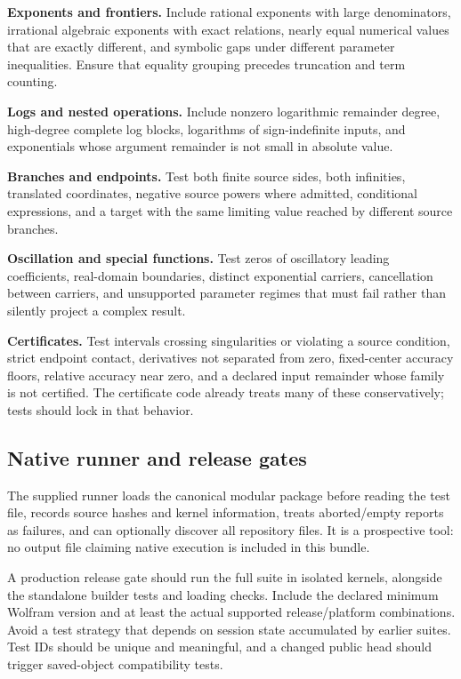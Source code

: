 \documentclass[11pt,a4paper]{article}
\newcommand{\code}[1]{\texttt{\detokenize{#1}}}
\theoremstyle{remark}\newtheorem{remark}[proposition]{Remark}
\begin{document}
\textbf{Exponents and frontiers.} Include rational exponents with large denominators, irrational algebraic exponents with exact relations, nearly equal numerical values that are exactly different, and symbolic gaps under different parameter inequalities. Ensure that equality grouping precedes truncation and term counting.

\textbf{Logs and nested operations.} Include nonzero logarithmic remainder degree, high-degree complete log blocks, logarithms of sign-indefinite inputs, and exponentials whose argument remainder is not small in absolute value.

\textbf{Branches and endpoints.} Test both finite source sides, both infinities, translated coordinates, negative source powers where admitted, conditional expressions, and a target with the same limiting value reached by different source branches.

\textbf{Oscillation and special functions.} Test zeros of oscillatory leading coefficients, real-domain boundaries, distinct exponential carriers, cancellation between carriers, and unsupported parameter regimes that must fail rather than silently project a complex result.

\textbf{Certificates.} Test intervals crossing singularities or violating a source condition, strict endpoint contact, derivatives not separated from zero, fixed-center accuracy floors, relative accuracy near zero, and a declared input remainder whose family is not certified. The certificate code already treats many of these conservatively; tests should lock in that behavior.\cite{certificates}

\subsection{Native runner and release gates}
The supplied runner loads the canonical modular package before reading the test file, records source hashes and kernel information, treats aborted/empty reports as failures, and can optionally discover all repository \code{.wlt} files. It is a prospective tool: no output file claiming native execution is included in this bundle.

A production release gate should run the full suite in isolated kernels, alongside the standalone builder tests and loading checks. Include the declared minimum Wolfram version and at least the actual supported release/platform combinations. Avoid a test strategy that depends on session state accumulated by earlier suites. Test IDs should be unique and meaningful, and a changed public head should trigger saved-object compatibility tests.
\end{document}
